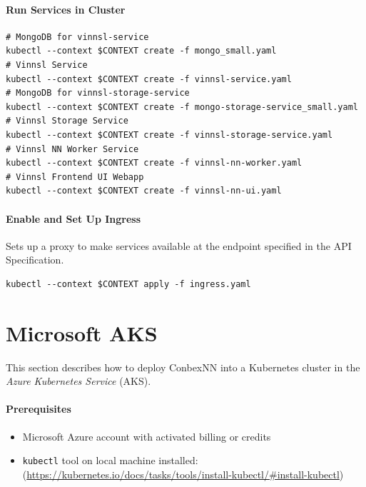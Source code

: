 \paragraph{Run Services in Cluster}\label{run-services-in-cluster-2}

\begin{verbatim}
# MongoDB for vinnsl-service
kubectl --context $CONTEXT create -f mongo_small.yaml 
# Vinnsl Service
kubectl --context $CONTEXT create -f vinnsl-service.yaml
# MongoDB for vinnsl-storage-service
kubectl --context $CONTEXT create -f mongo-storage-service_small.yaml
# Vinnsl Storage Service
kubectl --context $CONTEXT create -f vinnsl-storage-service.yaml
# Vinnsl NN Worker Service
kubectl --context $CONTEXT create -f vinnsl-nn-worker.yaml
# Vinnsl Frontend UI Webapp
kubectl --context $CONTEXT create -f vinnsl-nn-ui.yaml
\end{verbatim}

\paragraph{Enable and Set Up Ingress}\label{enable-and-set-up-ingress-2}

Sets up a proxy to make services available at the endpoint specified in
the API Specification.

\begin{verbatim}
kubectl --context $CONTEXT apply -f ingress.yaml
\end{verbatim}

\section{Microsoft AKS}\label{microsoft-aks}

This section describes how to deploy ConbexNN into a Kubernetes cluster
in the \emph{Azure Kubernetes Service} (AKS).

\paragraph{Prerequisites}\label{prerequisites-3}

\begin{itemize}
\tightlist
\item
  Microsoft Azure account with activated billing or credits
\item
  \texttt{kubectl} tool on local machine installed:
  (\url{https://kubernetes.io/docs/tasks/tools/install-kubectl/\#install-kubectl})
\end{itemize}

